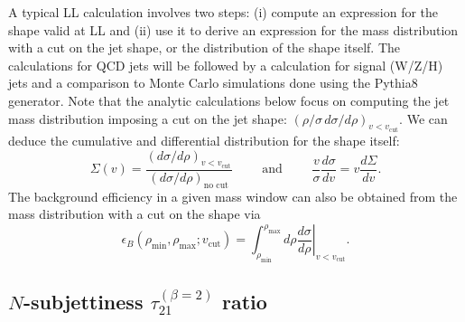 A typical LL calculation involves two steps: (i) compute an
expression for the shape valid at LL and (ii) use it to derive an
expression for the mass distribution with a cut on the jet shape, or
the distribution of the shape itself.
%
The calculations for QCD jets will be followed by a calculation for
signal (W/Z/H) jets and a comparison to Monte Carlo simulations done
using the Pythia8 generator.
%
Note that the analytic calculations below focus on computing the jet
mass distribution imposing a cut on the jet shape:
$(\rho/\sigma\,d\sigma/d\rho)_{v<v_\text{cut}}$. We can deduce the
cumulative and differential distribution for the shape itself:
\begin{equation}
  \Sigma(v)=\frac{(d\sigma/d\rho)_{v<v_\text{cut}}}
                 {(d\sigma/d\rho)_{\text{no cut}}}
  \qquad\text{ and }\qquad
  \frac{v}{\sigma}\frac{d\sigma}{dv} = v\frac{d\Sigma}{dv}.
\end{equation}
The background efficiency in a given mass window can also be obtained
from the mass distribution with a cut on the shape via
\begin{equation}
  \epsilon_B(\rho_\text{min},\rho_\text{max};v_\text{cut})
  =\int_{\rho_\text{min}}^{\rho_\text{max}} d\rho \left.\frac{d\sigma}{d\rho}\right|_{v<v_\text{cut}}.
\end{equation}

\subsection{$N$-subjettiness $\tau_{21}^{(\beta=2)}$ ratio}

